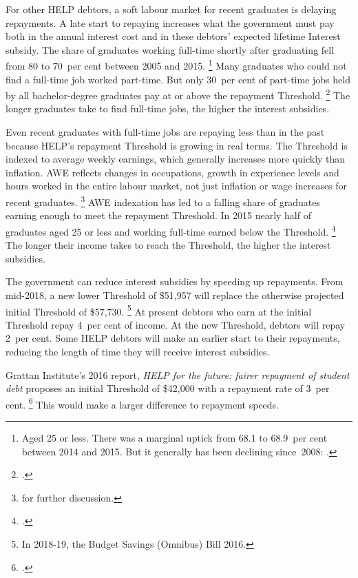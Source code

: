 \documentclass[embargoed]{grattan}
\begin{document}
For other \gls{HELP} debtors, a soft labour market for recent graduates is delaying repayments.
A late start to repaying increases what the government must pay both in the annual interest cost and in these debtors' expected lifetime \gls{Interest subsidy}.
The share of graduates working full-time shortly after graduating fell from 80 to 70~per cent between 2005 and 2015.%
\footnote{Aged 25 or less.
There was a marginal uptick from 68.1 to 68.9~per cent between 2014 and 2015.
But it generally has been declining since~2008: \textcite[][Figure~1]{GCA2015GradStatsemploymentsalary}.} Many graduates who could not find a full-time job worked part-time.
But only 30~per cent of part-time jobs held by all bachelor-degree graduates pay at or above the repayment \gls{Threshold}.%
\footcite[][Figure~7]{Norton2016HELPfuturefairer} 
The longer graduates take to find full-time jobs, the higher the interest subsidies.

Even recent graduates with full-time jobs are repaying less than in the past because \gls{HELP}'s repayment \gls{Threshold} is growing in real terms.
The \gls{Threshold} is indexed to average weekly earnings, which generally increases more quickly than inflation.
\gls{AWE} reflects changes in occupations, growth in experience levels and hours worked in the entire labour market, not just inflation or wage increases for recent graduates.%
\footnote{\textcite[][Chapter~8]{Norton2016HELPfuturefairer} for further discussion.} \gls{AWE} indexation has led to a falling share of graduates earning enough to meet the repayment \gls{Threshold}.
In 2015 nearly half of graduates aged 25 or less and working full-time earned below the \gls{Threshold}.%
\footcite{GCA2015GradStatsemploymentsalary} 
The longer their income takes to reach the \gls{Threshold}, the higher the interest subsidies.

The government can reduce interest subsidies by speeding up repayments.
From mid-2018, a new lower \gls{Threshold} of \$51,957 will replace the otherwise projected initial \gls{Threshold} of \$57,730.%
\footnote{In 2018-19, the Budget Savings (Omnibus) Bill 2016.} 
At present debtors who earn at the initial \gls{Threshold} repay 4~per cent of income.
At the new \gls{Threshold}, debtors will repay 2~per cent.
Some \gls{HELP} debtors will make an earlier start to their repayments, reducing the length of time they will receive interest subsidies.

Grattan Institute's 2016 report, \emph{HELP for the future: fairer repayment of student debt} proposes an initial \gls{Threshold} of \$42,000 with a repayment rate of 3~per cent.%
\footcite{Norton2016HELPfuturefairer} 
This would make a larger difference to repayment speeds.
\end{document}
